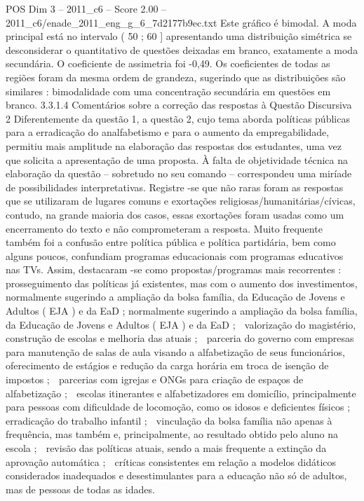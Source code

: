 \begin{textsample}{POS Dim 3 – 2011\_c6 – Score 2.00 – 2011\_c6/enade\_2011\_eng\_g\_6\_7d2177b9ec.txt}
Este gráfico é bimodal.
A moda principal está no intervalo ( 50 ; 60 ] apresentando uma distribuição simétrica se desconsiderar o quantitativo de questões deixadas em branco, exatamente a moda secundária.
O coeficiente de assimetria foi -0,49.
Os coeficientes de todas as regiões foram da mesma ordem de grandeza, sugerindo que as distribuições são similares : bimodalidade com uma concentração secundária em questões em branco. 3.3.1.4 Comentários sobre a correção das respostas à Questão Discursiva 2 Diferentemente da questão 1, a questão 2, cujo tema aborda políticas públicas para a erradicação do analfabetismo e para o aumento da empregabilidade, permitiu mais amplitude na elaboração das respostas dos estudantes, uma vez que solicita a apresentação de uma proposta.
À falta de objetividade técnica na elaboração da questão – sobretudo no seu comando – correspondeu uma miríade de possibilidades interpretativas.
Registre -se que não raras foram as respostas que se utilizaram de lugares comuns e exortações religiosas/humanitárias/cívicas, contudo, na grande maioria dos casos, essas exortações foram usadas como um encerramento do texto e não comprometeram a resposta.
Muito frequente também foi a confusão entre política pública e política partidária, bem como alguns poucos, confundiam programas educacionais com programas educativos nas TVs.
Assim, destacaram -se como propostas/programas mais recorrentes :  prosseguimento das políticas já existentes, mas com o aumento dos investimentos, normalmente sugerindo a ampliação da bolsa família, da Educação de Jovens e Adultos ( EJA ) e da EaD ; normalmente sugerindo a ampliação da bolsa família, da Educação de Jovens e Adultos ( EJA ) e da EaD ;  valorização do magistério, construção de escolas e melhoria das atuais ;  parceria do governo com empresas para manutenção de salas de aula visando a alfabetização de seus funcionários, oferecimento de estágios e redução da carga horária em troca de isenção de impostos ;  parcerias com igrejas e ONGs para criação de espaços de alfabetização ;  escolas itinerantes e alfabetizadores em domicílio, principalmente para pessoas com dificuldade de locomoção, como os idosos e deficientes físicos ;  erradicação do trabalho infantil ;  vinculação da bolsa família não apenas à frequência, mas também e, principalmente, ao resultado obtido pelo aluno na escola ;  revisão das políticas atuais, sendo a mais frequente a extinção da aprovação automática ;  críticas consistentes em relação a modelos didáticos considerados inadequados e desestimulantes para a educação não só de adultos, mas de pessoas de todas as idades.

\end{textsample}
